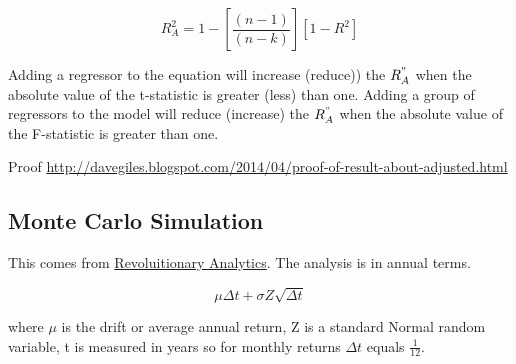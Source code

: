 \documentclass[12pt, a4paper, oneside]{article}\usepackage[]{graphicx}\usepackage[]{color}
\begin{document}
\begin{equation}
R_A^2 = 1 - \left [ \frac{(n-1)}{(n-k)} \right ] [1 - R^2]
\end{equation}

Adding a regressor to the equation will increase (reduce)) the $R_A^"$ when the absolute value of the t-statistic is greater (less) than one. Adding a group of regressors to the model will reduce (increase) the $R_A^"$ when the absolute value of the F-statistic is greater than one.  

Proof \href{http://davegiles.blogspot.com/2014/04/proof-of-result-about-adjusted.html}{http://davegiles.blogspot.com/2014/04/proof-of-result-about-adjusted.html}

\subsection{Monte Carlo Simulation}
This comes from \href{http://blog.revolutionanalytics.com/2014/04/quantitative-finance-applications-in-r-5.html}{Revoluitionary Analytics}.  The analysis is in annual terms.  

\begin{equation}
\mu \Delta t + \sigma Z \sqrt{\Delta t}
\end{equation}

where $\mu$ is the drift or average annual return, Z is a standard Normal random variable, t is measured in years so for monthly returns $\Delta t$ equals $\frac{1}{12}$.
\end{document}
